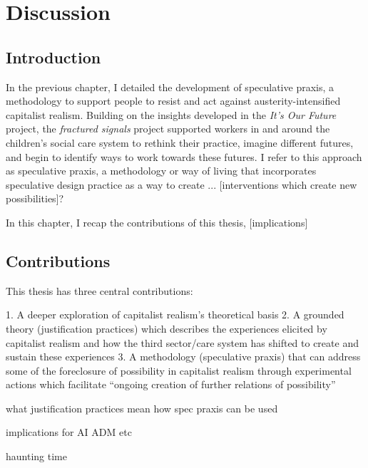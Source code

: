 \chapter{Discussion}
\label{}

\section{Introduction}
\label{sec:}
In the previous chapter, I detailed the development of speculative praxis, a methodology to support people to resist and act against austerity-intensified capitalist realism. Building on the insights developed in the \emph{It's Our Future} project, the \emph{fractured signals} project supported workers in and around the children's social care system to rethink their practice, imagine different futures, and begin to identify ways to work towards these futures. I refer to this approach as speculative praxis, a methodology or way of living that incorporates speculative design practice as a way to create ... [interventions which create new possibilities]?

In this chapter, I recap the contributions of this thesis, [implications]





\section{Contributions}
This thesis has three central contributions:  

1. A deeper exploration of capitalist realism’s theoretical basis
2. A grounded theory (justification practices) which describes the experiences elicited by capitalist realism and how the third sector/care system has shifted to create and sustain these experiences
3. A methodology (speculative praxis) that can address some of the foreclosure of possibility in capitalist realism through experimental actions which facilitate “ongoing creation of further relations of possibility”

what justification practices mean 
how spec praxis can be used

implications for AI ADM etc

haunting 
time


